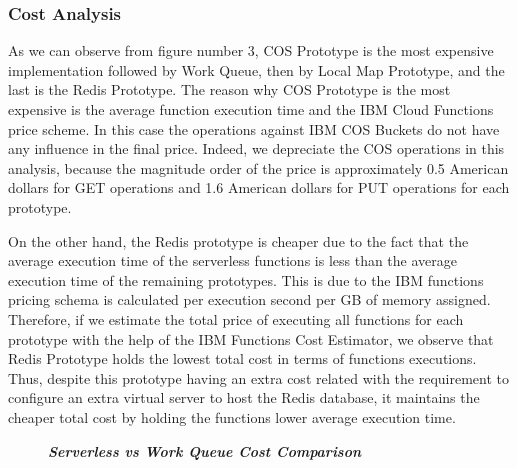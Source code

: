 \documentclass[sigplan, screen]{acmart}
\begin{document}
\vspace{2mm}
\subsubsection{Cost Analysis}
As we can observe from figure number 3, COS Prototype is the most expensive implementation followed by Work Queue, then by Local Map Prototype, and the last is the Redis Prototype. The reason why COS Prototype is the most expensive is the average function execution time and the IBM Cloud Functions price scheme. In this case the operations against IBM COS Buckets do not have any influence in the final price. Indeed, we depreciate the COS operations in this analysis, because the magnitude order of the price is approximately 0.5 American dollars for GET operations and 1.6 American dollars for PUT operations for each prototype.

On the other hand, the Redis prototype is cheaper due to the fact that the average execution time of the serverless functions is less than the average execution time of the remaining prototypes. This is due to the IBM functions pricing schema is calculated per execution second per GB of memory  assigned. Therefore, if we estimate the total price of executing all functions for each prototype with the help of the IBM Functions Cost Estimator\cite{ibmCostEstimator}, we observe that Redis Prototype holds the lowest total cost in terms of functions executions. Thus, despite this prototype having an extra cost related with the requirement to configure an extra virtual server to host the Redis database, it maintains the cheaper total cost by holding the functions lower average execution time.


\pgfplotsset{compat=1.14}
\begin{figure}[t]
\caption{\textit{\textbf{Serverless vs Work Queue Cost Comparison}}}
\end{figure}
\end{document}
